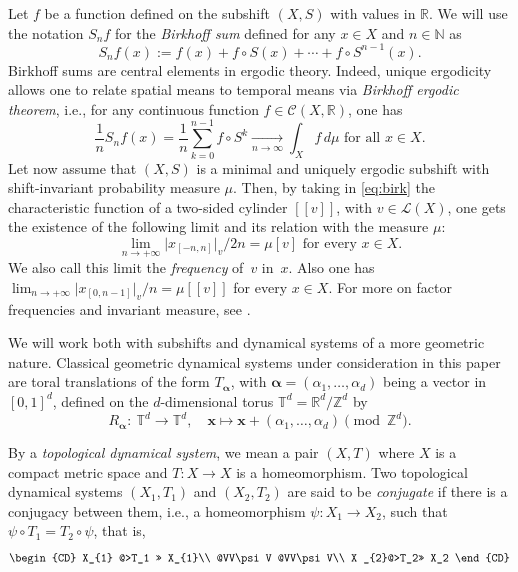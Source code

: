 \documentclass{article}
\theoremstyle{definition}
\newcommand{\R}{\mathbb{R}}
\newcommand{\C}{\mathcal{C}}
\newcommand{\balpha}{\boldsymbol{\alpha}}
\begin{document}
Let $f$ be a function  defined on the subshift  $(X,S)$ with values in ${\mathbb R}$. We will use the notation  $S_nf$ for the  {\em Birkhoff sum} defined for any $x \in X$ and $n \in {\mathbb N}$ as 
  \[
S_n f(x):=   f(x) + f\circ S(x) + \cdots + f \circ  S^{n-1}(x).
 \] Birkhoff sums are central elements  in  ergodic theory. 
 Indeed, unique ergodicity  allows one to  relate spatial means to temporal means  via  {\em Birkhoff ergodic
 theorem}, i.e., 
 for any  continuous function $ f\in  \C(X,\R)$, one has 
\begin{equation} \label{eq:birk}
\frac{1}{n} S_n f(x)=\frac{1}{n} \sum_{k=0}^{n-1}
f \circ S^k \xrightarrow[ n \rightarrow \infty]{}
\int_{X} f\, d\mu  \mbox{ for all } x \in X .
\end{equation}
Let   now  assume that $(X,S)$ is a minimal and  uniquely ergodic subshift with shift-invariant  probability measure $\mu$. 
Then,   by taking  in \cref{eq:birk}  the characteristic function of a two-sided cylinder $[[v]]$, with $v \in {\mathcal L}(X)$, one gets   the existence of the following limit  and its relation with the measure $\mu$:
 $$\lim_{n \to +\infty} \big|x_{[-n,n]}|_v/2n = \mu[v] \mbox{ for every }x \in X.$$  We  also call  this limit the \emph{frequency} of~$v$ in~$x$. 
Also  one has  $\lim_{n \to +\infty} \big|x_{[0,n-1]}|_v/n = \mu[[v]]$  for every $x \in X.$
For more on  factor frequencies  and invariant measure, see \cite[Chapter~7]{CANT}. 



We will  work both with   subshifts and dynamical  systems of a more geometric nature. Classical  geometric dynamical systems under consideration in this paper are    toral translations of the form  $T_{\balpha}$, with  $\balpha= (\alpha_1,\dots,\alpha_{d}) $  being  a vector in $[0,1]^d$,   defined on the $d$-dimensional torus  $\mathbb{T}^{d} = \mathbb{R}^{d}/\mathbb{Z}^{d}$ by \[
R_{\balpha}:\  \mathbb{T}^{d} \rightarrow \mathbb{T}^{d}, \quad  {\mathbf x} \mapsto  {\mathbf x}  + (\alpha_1,\dots,\alpha_{d})  \pmod{\mathbb{Z}^{d}}.
\]

By a {\em topological dynamical system},
we mean a pair $(X, T )$ where $X$ is a compact metric space and  $ T \colon  X \rightarrow  X$
is a homeomorphism. Two topological  dynamical systems $(X_1,T_1)$ and $(X_2,T_2)$ are said to  be  {\em conjugate} if there is  a  conjugacy between them,
i.e., a homeomorphism    $ \psi: X_1 \rightarrow X_2$, such that
$ \psi \circ  T_1= T_2\circ \psi$, that is, $$
\begin{CD}
X_{1} @>T_1 >> X_{1}\\
@VV\psi V @VV\psi V\\
X _{2}@>T_2>> X_2
\end{CD}
$$ 
\end{document}
